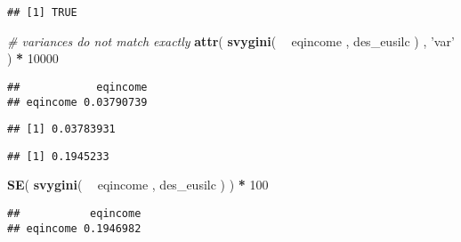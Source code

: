\documentclass[]{book}
\newenvironment{Shaded}{\begin{snugshade}}{\end{snugshade}}
\newcommand{\CommentTok}[1]{\textcolor[rgb]{0.56,0.35,0.01}{\textit{#1}}}
\newcommand{\DecValTok}[1]{\textcolor[rgb]{0.00,0.00,0.81}{#1}}
\newcommand{\KeywordTok}[1]{\textcolor[rgb]{0.13,0.29,0.53}{\textbf{#1}}}
\newcommand{\NormalTok}[1]{#1}
\newcommand{\OperatorTok}[1]{\textcolor[rgb]{0.81,0.36,0.00}{\textbf{#1}}}
\newcommand{\StringTok}[1]{\textcolor[rgb]{0.31,0.60,0.02}{#1}}
\begin{document}
\begin{verbatim}
## [1] TRUE
\end{verbatim}

\begin{Shaded}
\begin{Highlighting}[]
\CommentTok{# variances do not match exactly}
\KeywordTok{attr}\NormalTok{( }\KeywordTok{svygini}\NormalTok{( }\OperatorTok{~}\StringTok{ }\NormalTok{eqincome , des_eusilc ) , }\StringTok{'var'}\NormalTok{ ) }\OperatorTok{*}\StringTok{ }\DecValTok{10000}
\end{Highlighting}
\end{Shaded}

\begin{verbatim}
##            eqincome
## eqincome 0.03790739
\end{verbatim}

\begin{Shaded}
\end{Shaded}

\begin{verbatim}
## [1] 0.03783931
\end{verbatim}

\begin{Shaded}
\end{Shaded}

\begin{verbatim}
## [1] 0.1945233
\end{verbatim}

\begin{Shaded}
\begin{Highlighting}[]
\KeywordTok{SE}\NormalTok{( }\KeywordTok{svygini}\NormalTok{( }\OperatorTok{~}\StringTok{ }\NormalTok{eqincome , des_eusilc ) ) }\OperatorTok{*}\StringTok{ }\DecValTok{100}
\end{Highlighting}
\end{Shaded}

\begin{verbatim}
##           eqincome
## eqincome 0.1946982
\end{verbatim}
\end{document}
